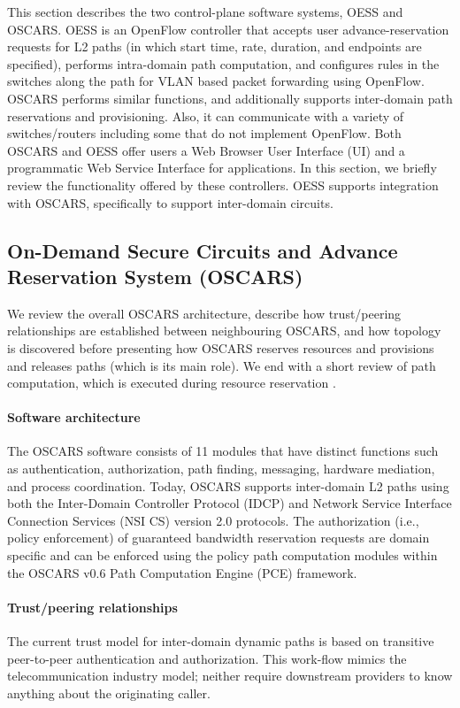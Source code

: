 This section describes the two control-plane software systems, OESS and OSCARS. OESS is an OpenFlow controller
that accepts user advance-reservation requests for L2 paths
(in which start time, rate, duration, and endpoints are specified), performs intra-domain path computation, and configures rules in the switches along the path for VLAN based
packet forwarding using OpenFlow. OSCARS performs similar functions, and additionally supports inter-domain path
reservations and provisioning. Also, it can communicate
with a variety of switches/routers including some that do not
implement OpenFlow. Both OSCARS and OESS offer users
a Web Browser User Interface (UI) and a programmatic Web Service Interface for applications. In this section, we briefly
review the functionality offered by these controllers.
OESS supports integration with OSCARS, specifically to support inter-domain circuits.

\subsection{On-Demand Secure Circuits and Advance Reservation System (OSCARS)}
We review the overall OSCARS architecture, describe how trust/peering relationships are established between neighbouring OSCARS, and how topology is discovered before presenting how OSCARS reserves resources and provisions and releases paths (which is its main role). We end with a short review of path computation, which is executed during resource reservation \cite{OSCARS}.

\paragraph{Software architecture}
The OSCARS software consists of 11 modules that have distinct functions such as authentication, authorization, path finding, messaging, hardware mediation, and process coordination. Today, OSCARS supports inter-domain L2 paths using both the Inter-Domain Controller Protocol (IDCP) \cite{IDCP} and Network Service Interface Connection Services (NSI CS) version 2.0 \cite{NSI} protocols. The authorization (i.e., policy enforcement) of guaranteed bandwidth reservation requests are domain specific and can be enforced using the policy path computation modules within the OSCARS v0.6 Path Computation Engine (PCE) framework.

\paragraph{Trust/peering relationships}
The current trust model for
inter-domain dynamic paths is based on transitive peer-to-peer authentication and authorization. This work-flow mimics the telecommunication industry model; neither require downstream providers to know anything about the originating caller.


